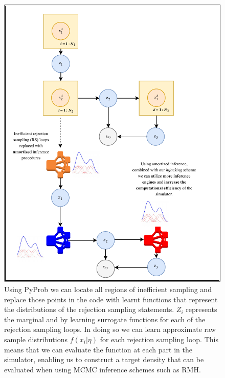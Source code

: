 \documentclass{article}
\begin{document}
\begin{figure}
  \includegraphics[]{amoritized_rejection.pdf}
    \caption{Using PyProb we can locate all regions of inefficient sampling 
    and replace those points in the code with learnt functions that represent
    the distributions of the rejection sampling statements. $Z_{i}$ represents the marginal and 
    by learning surrogate functions for each of the rejection sampling loops.
    In doing so we can learn approximate raw sample distributions $f(x_{i} | \eta)$ for each
    rejection sampling loop. This means that we can evaluate the function at each part in the simulator, enabling
    us to construct a target density that can be evaluated when using MCMC inference schemes such as RMH.}
    \label{fig:amortized_sampling}
\end{figure}
\end{document}
